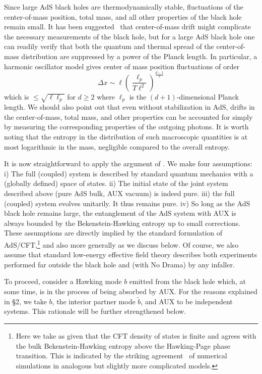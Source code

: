 \documentclass[12pt]{article}
\newcommand{\be}{\begin{equation}}
\newcommand{\ee}{\end{equation}}
\begin{document}
{{{Since large AdS black holes are thermodynamically stable, fluctuations} of the center-of-mass position, total mass, and all other properties of the black hole remain small.  It has been suggested~\cite{SussP,Nomura2,Hsu}
that center-of-mass drift might complicate the necessary measurements of the black hole, but for a large AdS black hole one can readily verify that both the quantum and thermal spread of the center-of-mass distribution are {suppressed by a power of} the Planck length. In particular, a harmonic oscillator model gives center of mass position fluctuations of {order
\be
\Delta x \sim \ell {\left( \frac{\ell_p}{T\ell^2} \right)^{\frac{d-1}{2}}}
\ee
which is $\le \sqrt{\ell \ell_p}$ for $d \ge 2$ }where $\ell_p$ is the $(d+1)$-dimensional Planck length.  We should also point out that even without stabilization in AdS, drifts in the center-of-mass, total mass, and other properties can  be accounted for simply by measuring the corresponding properties of the outgoing photons.  It is worth noting that the entropy in the distribution of such macroscopic quantities is at most logarithmic in the mass, negligible compared to the overall entropy.

It is now straightforward to apply the argument of \cite{Almheiri:2012rt}.  We make four assumptions: i) The full (coupled) system is described by standard quantum mechanics with a (globally defined) space of states.
ii) The initial state of the joint system described above (pure AdS bulk, AUX vacuum) is indeed pure. iii) the full (coupled) system evolves unitarily. It thus remains pure.  iv) So long as the AdS black hole remains large, the entanglement of the AdS system with AUX is always bounded by the Bekenstein-Hawking entropy up to small corrections.  These assumptions are directly implied by the standard formulation of AdS/CFT,\footnote{Here we take as given that the CFT density of states is finite and agrees with the bulk Bekenstein-Hawking entropy above the Hawking-Page phase transition.  This is indicated by the striking agreement~\cite{Hanada:2008ez} of numerical simulations in analogous but slightly more complicated models. } and also more generally as we discuss below.  Of course, we also assume that standard low-energy effective field theory describes both experiments performed far outside the black hole and (with No Drama) by any infaller.

To proceed, consider a Hawking mode $b$ emitted from the black hole which, at some time, is in the process of being absorbed by AUX.  For the reasons explained in \S2, we take $b$, the interior partner mode $\tilde b$, and AUX to be independent systems.  This rationale will be further strengthened below.


}}
\end{document}

